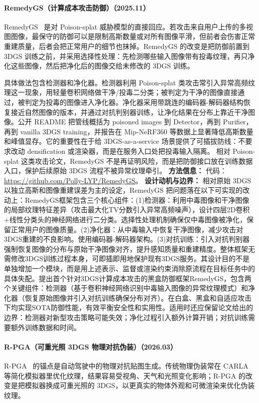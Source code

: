 \paragraph{RemedyGS（计算成本攻击防御）（2025.11）}
RemedyGS~\cite{2511_22147} 是对 Poison-splat 威胁模型的直接回应。若攻击来自用户上传的多视图图像，最保守的防御可以是限制高斯数量或对所有图像平滑，但前者会伤害正常重建质量，后者会把正常用户的细节也抹掉。RemedyGS 的改变是把防御前置到 3DGS 训练之前，并采用选择性处理：先检测哪些输入图像带有投毒纹理，再只净化这些图像，然后把净化后的图像交给未修改的 3DGS 训练。

具体做法包含检测器和净化器。检测器利用 Poison-splat 类攻击常引入异常高频纹理这一现象，用轻量卷积网络做干净/投毒二分类；被判定为干净的图像直接通过，被判定为投毒的图像进入净化器。净化器采用带跳连的编码器-解码器结构恢复接近自然图像的版本，并通过对抗判别器训练，让净化结果在分布上靠近干净图像。公开 README 把管线概括为 poisoned images 到 Detector，再到 Purifier，再到 vanilla 3DGS training，并报告在 Mip-NeRF360 等数据上显著降低高斯数量和峰值显存。它的重要性在于给 3DGS-as-a-service 场景提供了可插拔防线：不要求改动 densification 或渲染器，而是在服务入口处把投毒输入隔离。
相对 Poison-splat 这类攻击论文，RemedyGS 不是再证明风险，而是把防御接口放在训练数据入口，保护后续原始 3DGS 流程不被异常纹理牵引。
\textbf{方法信息：} 代码：\url{https://github.com/Polly-LYP/RemedyGS}。
\textbf{设计动机与边界：} 相对原始 3DGS 以独立高斯和图像重建误差为主的设定，RemedyGS 把问题落在以下可实现的改动上：RemedyGS框架包含三个核心组件：(1)检测器：利用中毒图像和干净图像的局部纹理特征差异（攻击最大化TV分数引入异常高频噪声），设计四层2D卷积+线性分类头的神经网络进行二分类。选择性处理机制确保仅中毒图像被净化，保留正常用户的图像质量。(2)净化器：从中毒输入中恢复干净图像，减少攻击对3DGS重建的不良影响。使用编码器-解码器架构。(3)对抗训练：引入对抗判别器强制恢复图像的分布与原始干净图像对齐，提升感知质量和重建精度。整体框架无需修改3DGS训练过程本身，可即插即用地保护现有3DGS服务。其设计目的不是单独增加一个模块，而是用上述表示、监督或渲染约束消除原流程在目标任务中的具体失配。提出首个针对3DGS计算成本攻击的黑盒防御框架RemedyGS，包含两个关键组件：检测器（基于卷积神经网络识别中毒输入图像的异常纹理模式）和净化器（恢复原始图像并引入对抗训练确保分布对齐）。在白盒、黑盒和自适应攻击下均实现SOTA防御性能，有效平衡安全性和实用性。适用时还应保留论文给出的边界：检测器对新型攻击策略可能失效；净化过程引入额外计算开销；对抗训练需要额外训练数据和时间。
\paragraph{R-PGA（可重光照 3DGS 物理对抗伪装）（2026.03）}
R-PGA~\cite{2603_26067} 的锚点是自动驾驶中的物理对抗贴图生成。传统物理伪装常在 CARLA 等简化模拟器里优化纹理，结果容易受视角、天气和光照变化影响；R-PGA 的改变是把模拟器换成可重光照的 3DGS，以更真实的物体外观和可微渲染来优化伪装纹理。


